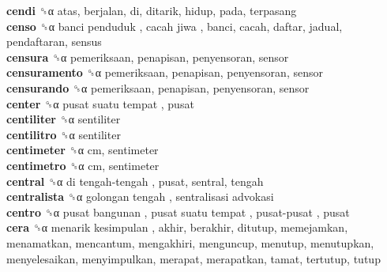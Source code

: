 \textbf{cendi} ␝α  atas, berjalan, di, ditarik, hidup, pada, terpasang  \\
\textbf{censo} ␝α   banci penduduk ,  cacah jiwa , banci, cacah, daftar, jadual, pendaftaran, sensus  \\
\textbf{censura} ␝α  pemeriksaan, penapisan, penyensoran, sensor  \\
\textbf{censuramento} ␝α  pemeriksaan, penapisan, penyensoran, sensor  \\
\textbf{censurando} ␝α  pemeriksaan, penapisan, penyensoran, sensor  \\
\textbf{center} ␝α   pusat suatu tempat , pusat  \\
\textbf{centiliter} ␝α  sentiliter  \\
\textbf{centilitro} ␝α  sentiliter  \\
\textbf{centimeter} ␝α  cm, sentimeter  \\
\textbf{centimetro} ␝α  cm, sentimeter  \\
\textbf{central} ␝α   di tengah-tengah , pusat, sentral, tengah  \\
\textbf{centralista} ␝α   golongan tengah ,  sentralisasi advokasi   \\
\textbf{centro} ␝α   pusat bangunan ,  pusat suatu tempat ,  pusat-pusat , pusat  \\
\textbf{cera} ␝α   menarik kesimpulan , akhir, berakhir, ditutup, memejamkan, menamatkan, mencantum, mengakhiri, menguncup, menutup, menutupkan, menyelesaikan, menyimpulkan, merapat, merapatkan, tamat, tertutup, tutup  \\
